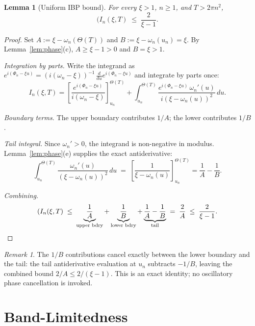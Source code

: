 \documentclass[12pt]{amsart}
\newtheorem{lemma}[theorem]{Lemma}
\theoremstyle{definition}
\theoremstyle{remark}
\newtheorem{remark}[theorem]{Remark}
\newcommand{\abs} [en.wikipedia](https://en.wikipedia.org/wiki/Z_function){\left|#1\right|}
\begin{document}
\begin{lemma}[Uniform IBP bound]\label{lem:IBP}
For every $\xi>1$, $n\ge 1$, and $T>2\pi n^2$,
\[
  \abs{I_n(\xi,T)}\;\le\;\frac{2}{\xi-1}.
\]
\end{lemma}

\begin{proof}
Set $A:=\xi-\omega_n(\Theta(T))$ and $B:=\xi-\omega_n(u_n)=\xi$.
By Lemma~\ref{lem:phase}(c), $A\ge\xi-1>0$ and $B=\xi>1$.

\smallskip\noindent
\textit{Integration by parts.}
Write the integrand as
$e^{i(\Phi_n-\xi u)}=(i(\omega_n-\xi))^{-1}\,
\tfrac{d}{du}e^{i(\Phi_n-\xi u)}$
and integrate by parts once:
\begin{equation}\label{eq:IBP-formula}
  I_n(\xi,T)
  =\left[\frac{e^{i(\Phi_n-\xi u)}}{i(\omega_n-\xi)}\right]_{u_n}^{\Theta(T)}
  +\int_{u_n}^{\Theta(T)}
    \frac{e^{i(\Phi_n-\xi u)}\,\omega_n'(u)}{i(\xi-\omega_n(u))^{2}}\,du.
\end{equation}

\smallskip\noindent
\textit{Boundary terms.}
The upper boundary contributes $1/A$;
the lower contributes $1/B$.

\smallskip\noindent
\textit{Tail integral.}
Since $\omega_n'>0$, the integrand is non-negative in modulus.
Lemma~\ref{lem:phase}(e) supplies the exact antiderivative:
\[
  \int_{u_n}^{\Theta(T)}\frac{\omega_n'(u)}{(\xi-\omega_n(u))^{2}}\,du
  \;=\;\left[\frac{1}{\xi-\omega_n(u)}\right]_{u_n}^{\Theta(T)}
  =\frac{1}{A}-\frac{1}{B}.
\]

\smallskip\noindent
\textit{Combining.}
\[
  \abs{I_n(\xi,T)}
  \;\le\;\underbrace{\frac{1}{A}}_{\text{upper bdry}}
         +\underbrace{\frac{1}{B}}_{\text{lower bdry}}
         +\underbrace{\frac{1}{A}-\frac{1}{B}}_{\text{tail}}
  \;=\;\frac{2}{A}
  \;\le\;\frac{2}{\xi-1}.\qedhere
\]
\end{proof}

\begin{remark}
The $1/B$ contributions cancel exactly between the lower boundary and
the tail: the tail antiderivative evaluation at $u_n$ subtracts $-1/B$,
leaving the combined bound $2/A\le 2/(\xi-1)$.
This is an exact identity; no oscillatory phase cancellation is invoked.
\end{remark}

\section{Band-Limitedness}
\end{document}
